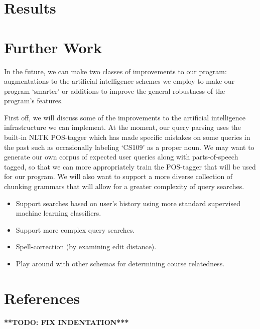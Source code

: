 \documentclass[12pt]{article}
\newcommand{\todo}[1]{{\Large \bf ***TODO: #1***}}
\begin{document}
\section*{Results}
	
\section*{Further Work}

In the future, we can make two classes of improvements to our program: augmentations to 
the artificial intelligence schemes we employ to make our program `smarter' or additions to
improve the general robustness of the program's features.

First off, we will discuss some of the improvements to the artificial intelligence infrastructure
we can implement. At the moment, our query parsing uses the built-in NLTK POS-tagger which
has made specific mistakes on some queries in the past such as occasionally labeling `CS109' as a proper noun. We may want to generate our own corpus of expected user queries along with parts-of-speech tagged, so that we can more appropriately train the POS-tagger that will be used for our program. We will also want to support a more diverse collection of chunking grammars that will allow for a greater complexity of query searches. 

\begin{itemize}
\item Support searches based on user's history using more standard supervised machine learning classifiers.
\item Support more complex query searches.
\item Spell-correction (by examining edit distance).
\item Play around with other schemas for determining course relatedness.
\end{itemize}

\section*{References}
\todo{FIX INDENTATION}
\end{document}
